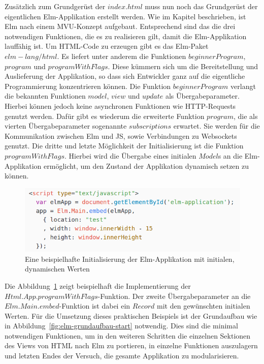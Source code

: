 Zusätzlich zum Grundgerüst der $index.html$ muss nun noch das Grundgerüst der eigentlichen Elm-Applikation erstellt werden. Wie im Kapitel  beschrieben, ist Elm nach einem \ac{MVU}-Konzept aufgebaut. Entsprechend sind das die drei notwendigen Funktionen, die es zu realisieren gilt, damit die Elm-Applikation lauffähig ist. Um \ac{HTML}-Code zu erzeugen gibt es das Elm-Paket $elm-lang/html$. Es liefert unter anderem die Funktionen $beginnerProgram$, $program$ und $programWithFlags$. Diese kümmern sich um die Bereitstellung und Auslieferung der Applikation, so dass sich Entwickler ganz auf die eigentliche Programmierung konzentrieren können. Die Funktion $beginnerProgram$ verlangt die bekannten Funktionen $model$, $view$ und $update$ als Übergabeparameter. Hierbei können jedoch keine asynchronen Funktionen wie \ac{HTTP}-Requests genutzt werden.
Dafür gibt es wiederum die erweiterte Funktion $program$, die als vierten Übergabeparameter sogenannte $subscriptions$ erwartet. Sie werden für die Kommunikation zwischen Elm und \ac{JS}, sowie Verbindungen zu Websockets genutzt.
Die dritte und letzte Möglichkeit der Initialisierung ist die Funktion $programWithFlags$. Hierbei wird die Übergabe eines initialen $Model$s an die Elm-Applikation ermöglicht, um den Zustand der Applikation dynamisch setzen zu können.
\begin{figure}[ht]
\centering\includegraphics[scale=0.6]{img/programWithFlags_pass_data.png}
\caption{Eine beispielhafte Initialisierung der Elm-Applikation mit initialen, dynamischen Werten}\label{fig:programWithFlags}
\end{figure}
Die Abbildung~\ref{fig:programWithFlags} zeigt beispielhaft die Implementierung der $Html.App.programWithFlags$-Funktion. Der zweite Übergabeparameter an die $Elm.Main.embed$-Funktion ist dabei ein $Record$ mit den gewünschten initialen Werten.
Für die Umsetzung dieses praktischen Beispiels ist der Grundaufbau wie in Abbildung~\ref{fig:elm-grundaufbau-start} notwendig. Dies sind die minimal notwendigen Funktionen, um in den weiteren Schritten die einzelnen Sektionen des Views von \ac{HTML} nach Elm zu portieren, in einzelne Funktionen auszulagern und letzten Endes der Versuch, die gesamte Applikation zu modularisieren.
